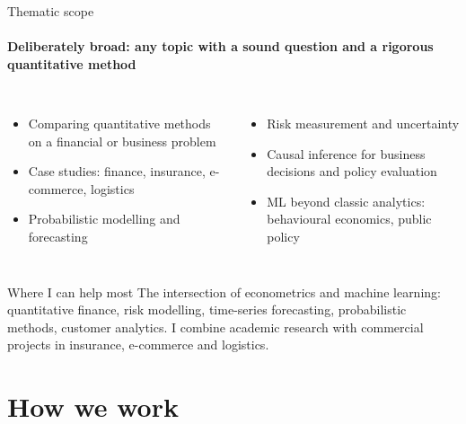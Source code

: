 \documentclass[aspectratio=169,11pt,t]{beamer}
\begin{document}
\begin{frame}{Thematic scope}
  \framesubtitle{Deliberately broad: any topic with a sound question and a rigorous quantitative method}
  \begin{columns}[T,onlytextwidth]
    \begin{itemize}
      \item Comparing quantitative methods on a financial or business problem
      \item Case studies: finance, insurance, e-commerce, logistics
      \item Probabilistic modelling and forecasting
    \end{itemize}
    \begin{itemize}
      \item Risk measurement and uncertainty
      \item Causal inference for business decisions and policy evaluation
      \item ML beyond classic analytics: behavioural economics, public policy
    \end{itemize}
  \end{columns}

  \bigskip
  \begin{block}{Where I can help most}
    The intersection of econometrics and machine learning: quantitative finance, risk modelling,
    time-series forecasting, probabilistic methods, customer analytics. I combine academic research
    with commercial projects in insurance, e-commerce and logistics.
  \end{block}
\end{frame}

\section{How we work}
\end{document}
